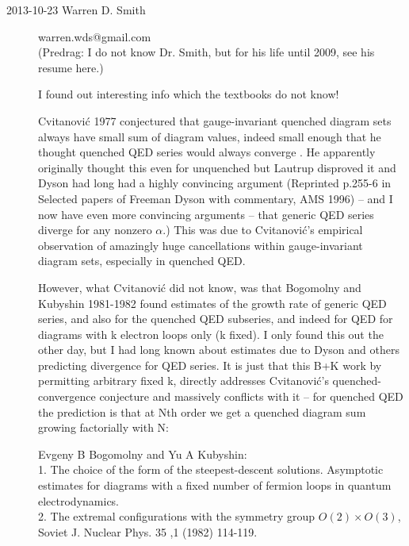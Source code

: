 

\begin{description}

\item[2013-10-23  Warren D. Smith] warren.wds@gmail.com
\\
(Predrag: I do not know
Dr. Smith, but for his life until 2009, see his resume
{here}.)

I found out interesting info which the textbooks do not know!

Cvitanovi\'c 1977 conjectured that gauge-invariant quenched diagram sets
always have small sum of diagram values, indeed small enough that he
thought quenched QED series
would always converge
    .
He apparently originally thought this even
for unquenched but Lautrup disproved it and Dyson had long had a
highly convincing argument (Reprinted p.255-6 in Selected papers
of Freeman Dyson with
commentary, AMS 1996)
-- and I now have even more convincing
arguments -- that generic QED series diverge for any nonzero $\alpha$.)
This was due to Cvitanovi\'c's empirical observation of amazingly huge
cancellations within gauge-invariant diagram sets, especially in
quenched QED.

However, what Cvitanovi\'c did not know, was that
{Bogomolny} and Kubyshin 1981-1982
found estimates of the growth rate of generic QED series, and also for the
quenched QED subseries,
and indeed for QED for diagrams with k electron loops only (k fixed).
I only found this out the other day, but I had long known about
estimates due to Dyson and others predicting divergence for QED
series.  It is just that this B+K work by permitting arbitrary fixed
k, directly addresses Cvitanovi\'c's quenched-convergence conjecture and
massively conflicts with it -- for quenched QED the prediction is that
at Nth order we get a quenched diagram sum growing factorially with N:

Evgeny B Bogomolny and Yu A Kubyshin:
\\
1. The choice of the form of the
steepest-descent solutions.
Asymptotic estimates for diagrams with a fixed number of fermion loops
in quantum electrodynamics.
\\
2. The extremal configurations with the
symmetry group $O(2)\times O(3)$,
Soviet J. Nuclear Phys. 35 ,1 (1982) 114-119.


\end{description}
